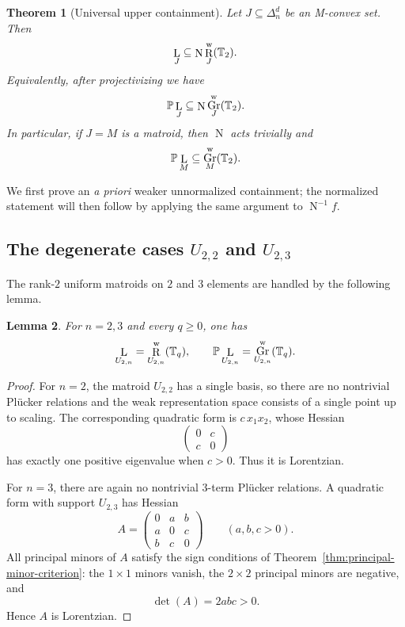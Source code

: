 \documentclass[12pt]{amsart}
\newtheorem{theorem}{Theorem}[section]
\newtheorem{lemma}[theorem]{Lemma}
\theoremstyle{definition}
\newcommand{\1}{\mathbf{1}}
\DeclareMathOperator{\upN}{N}   %
\DeclareMathOperator{\upL}{L}   %
\DeclareMathOperator{\upR}{R}   %
\DeclareMathOperator{\Gr}{Gr}
\renewcommand\P{{\mathbb P}}
\newcommand\T{{\mathbb T}}
\begin{document}
\begin{theorem}[Universal upper containment]
\label{thm:universal-upper-containment}
Let $J\subseteq \Delta_n^d$ be an M-convex set. Then
\[
\upL_J \subseteq \upN \upR_J^{\rm w}(\T_2).
\]
Equivalently, after projectivizing we have
\[
\P\upL_J \subseteq \upN \Gr_J^{\rm w}(\T_2).
\]
In particular, if $J=M$ is a matroid, then $\upN$ acts trivially and
\[
\P\upL_M \subseteq \Gr_M^{\rm w}(\T_2).
\]
\end{theorem}

We first prove an \emph{a priori} weaker unnormalized containment; the normalized statement will then follow by applying the same argument to
$\upN^{-1}f$.  

\subsection{The degenerate cases $U_{2,2}$ and $U_{2,3}$}

The rank-$2$ uniform matroids on $2$ and $3$ elements are handled by the following lemma.

\begin{lemma}
\label{lem:U22-U23}
For $n=2,3$ and every $q\ge 0$, one has
\[
\upL_{U_{2,n}} = \upR_{U_{2,n}}^{\rm w}(\T_q),
\qquad
\P\upL_{U_{2,n}} = \Gr_{U_{2,n}}^{\rm w}(\T_q).
\]
\end{lemma}

\begin{proof}
For $n=2$, the matroid $U_{2,2}$ has a single basis, so there are no nontrivial
Pl\"ucker relations and the weak representation space consists of a single point up to
scaling. The corresponding quadratic form is $c\,x_1x_2$, whose Hessian
\[
\begin{pmatrix}
0 & c\\
c & 0
\end{pmatrix}
\]
has exactly one positive eigenvalue when $c>0$. Thus it is Lorentzian.

For $n=3$, there are again no nontrivial $3$-term Pl\"ucker relations. A quadratic form
with support $U_{2,3}$ has Hessian
\[
A=
\begin{pmatrix}
0 & a & b\\
a & 0 & c\\
b & c & 0
\end{pmatrix}
\qquad (a,b,c>0).
\]
All principal minors of $A$ satisfy the sign conditions of
Theorem~\ref{thm:principal-minor-criterion}: the $1\times 1$ minors vanish, the
$2\times 2$ principal minors are negative, and
\[
\det(A)=2abc>0.
\]
Hence $A$ is Lorentzian.
\end{proof}
\end{document}
